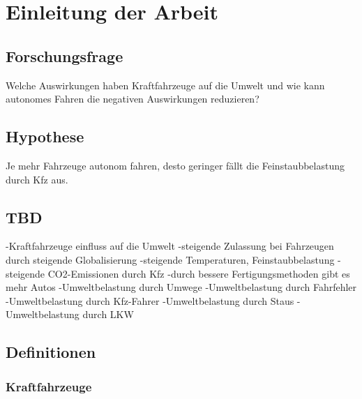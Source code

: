 \chapter{Einleitung der Arbeit}

\section{Forschungsfrage}

Welche Auswirkungen haben Kraftfahrzeuge auf die Umwelt und wie kann autonomes Fahren die negativen Auswirkungen reduzieren?

\section{Hypothese}

Je mehr Fahrzeuge autonom fahren, desto geringer fällt die Feinstaubbelastung durch Kfz aus.



\section{TBD}

-Kraftfahrzeuge einfluss auf die Umwelt
-steigende Zulassung bei Fahrzeugen durch steigende Globalisierung
-steigende Temperaturen, Feinstaubbelastung
-steigende CO2-Emissionen durch Kfz
-durch bessere Fertigungsmethoden gibt es mehr Autos
-Umweltbelastung durch Umwege
-Umweltbelastung durch Fahrfehler
-Umweltbelastung durch Kfz-Fahrer
-Umweltbelastung durch Staus
-Umweltbelastung durch LKW

\section{Definitionen}
\subsection{Kraftfahrzeuge}

